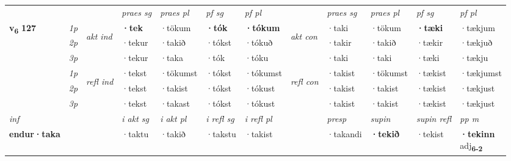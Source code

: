 \begin{longtable}[l]{X>{\footnotesize\itshape}llXXXXlXXXX}
\midrule

 & &   & \textit{praes sg}  & \textit{praes pl}    & \textit{ pf sg} & \textit{pf pl} & & \textit{praes sg}  & \textit{praes pl}    & \textit{pf sg} & \textit{pf pl }  \\ \cmidrule{4-7} \cmidrule{9-12}
 \multirow{2}{*}{{{\textbf{v{\textsubscript{6}}} \Large{\textbf{127}}}}}  & 1p & \multirow{3}{*}{\begin{turn}{90}\textit{akt ind}\end{turn}} & \textbf{·tek} & ·tökum & \textbf{·tók} & \textbf{·tókum} & \multirow{3}{*}{\begin{turn}{90}\textit{akt con}\end{turn}} &·taki & ·tökum & \textbf{·tæki} & ·tækjum\\*
 & 2p &  &  ·tekur  & ·takið & ·tókst & ·tókuð & & ·takir & ·takið & ·tækir & ·tækjuð \\*
 & 3p &  & ·tekur & ·taka & ·tók & ·tóku & & ·taki & ·taki& ·tæki & ·tækju \\*
\cmidrule{4-7} \cmidrule{9-12}
 & 1p & \multirow{3}{*}{\begin{turn}{90}\textit{refl ind}\end{turn}}  & ·tekst & ·tökumst & ·tókst & ·tókumst & \multirow{3}{*}{\begin{turn}{90}\textit{refl con}\end{turn}}  &·takist & ·tökumst & ·tækist & ·tækjumst \\*
 & 2p &  & ·tekst & ·takist & ·tókst & ·tókust & &·takist & ·takist & ·tækist & ·tækjust \\*
 & 3p  & & ·tekst & ·takast & ·tókst & ·tókust & & ·takist & ·takist& ·tækist & ·tækjust \\*
\cmidrule{4-7} \cmidrule{9-12}

   {\textit{inf}} & &  & \textit{i akt sg} & \textit{i akt pl} & \textit{i refl sg} & \textit{i refl pl} && \textit{presp} & \textit{supin} & \textit{supin refl} & \textit{pp m} \\*
  {\textbf{endur\allowbreak ·taka}} & && ·taktu  & ·takið & ·takstu & ·takist && ·takandi &  \textbf{·tekið} & ·tekist & \specialcell{\textbf{·tekinn} \\ adj\textbf{\textsubscript{6-2}}} \\*

\midrule


\end{longtable}
